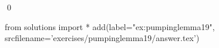 
\begin{ex} 
  \label{ex:pumpinglemma19}
  
  \qed
\end{ex} 
\begin{python0}
from solutions import *
add(label="ex:pumpinglemma19",
    srcfilename='exercises/pumpinglemma19/answer.tex') 
\end{python0}
